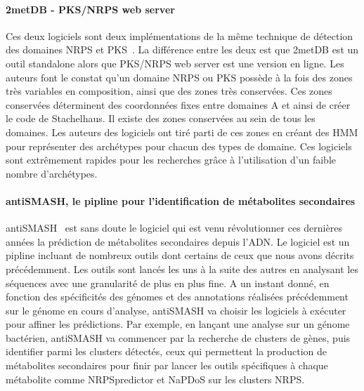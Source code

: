 \documentclass[12pt,french,twoside]{report}
\begin{document}
\paragraph{2metDB - PKS/NRPS web server}
Ces deux logiciels sont deux implémentations de la même technique de détection des domaines NRPS et PKS~\cite{bachmann_chapter_2009}.
La différence entre les deux est que 2metDB est un outil standalone alors que PKS/NRPS web server est une version en ligne.
Les auteurs font le constat qu'un domaine NRPS ou PKS possède à la fois des zones très variables en composition, ainsi que des zones très conservées.
Ces zones conservées déterminent des coordonnées fixes entre domaines A et ainsi de créer le code de Stachelhaus.
Il existe des zones conservées au sein de tous les domaines.
Les auteurs des logiciels ont tiré parti de ces zones en créant des HMM pour représenter des archétypes pour chacun des types de domaine.
Ces logiciels sont extrêmement rapides pour les recherches grâce à l'utilisation d'un faible nombre d'archétypes.


\label{antismash}
\paragraph{antiSMASH, le pipline pour l'identification de métabolites secondaires}
antiSMASH~\cite{weber_antismash_2015,medema_antismash:_2011} est sans doute le logiciel qui est venu révolutionner ces dernières années la prédiction de métabolites secondaires depuis l'ADN.
Le logiciel est un pipline incluant de nombreux outils dont certains de ceux que nous avons décrits précédemment.
Les outils sont lancés les uns à la suite des autres en analysant les séquences avec une granularité de plus en plus fine.
A un instant donné, en fonction des spécificités des génomes et des annotations réalisées précédemment sur le génome en cours d'analyse, antiSMASH va choisir les logiciels à exécuter pour affiner les prédictions.
Par exemple, en lançant une analyse sur un génome bactérien, antiSMASH va commencer par la recherche de clusters de gènes, puis identifier parmi les clusters détectés, ceux qui permettent la production de métabolites secondaires pour finir par lancer les outils spécifiques à chaque métabolite comme NRPSpredictor et NaPDoS sur les clusters NRPS.
\end{document}
